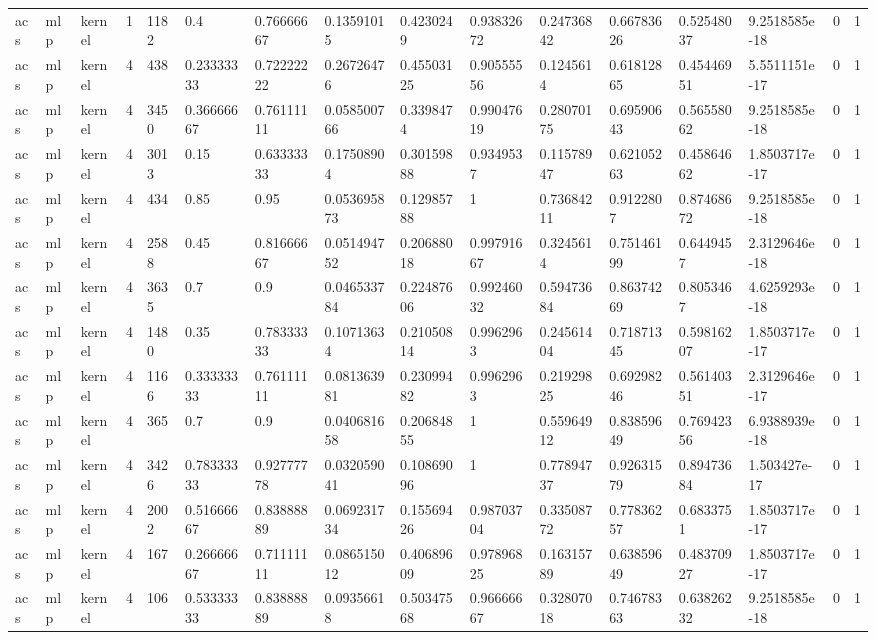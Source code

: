 \begin{tabular}{llllllllllllllll}
acs & mlp & kernel & 1 & 1182 & 0.4 & 0.76666667 & 0.13591015 & 0.4230249 & 0.93832672 & 0.24736842 & 0.66783626 & 0.52548037 & 9.2518585e-18 & 0 & 1 \\
acs & mlp & kernel & 4 & 438 & 0.23333333 & 0.72222222 & 0.26726476 & 0.45503125 & 0.90555556 & 0.1245614 & 0.61812865 & 0.45446951 & 5.5511151e-17 & 0 & 1 \\
acs & mlp & kernel & 4 & 3450 & 0.36666667 & 0.76111111 & 0.058500766 & 0.3398474 & 0.99047619 & 0.28070175 & 0.69590643 & 0.56558062 & 9.2518585e-18 & 0 & 1 \\
acs & mlp & kernel & 4 & 3013 & 0.15 & 0.63333333 & 0.17508904 & 0.30159888 & 0.9349537 & 0.11578947 & 0.62105263 & 0.45864662 & 1.8503717e-17 & 0 & 1 \\
acs & mlp & kernel & 4 & 434 & 0.85 & 0.95 & 0.053695873 & 0.12985788 & 1 & 0.73684211 & 0.9122807 & 0.87468672 & 9.2518585e-18 & 0 & 1 \\
acs & mlp & kernel & 4 & 2588 & 0.45 & 0.81666667 & 0.051494752 & 0.20688018 & 0.99791667 & 0.3245614 & 0.75146199 & 0.6449457 & 2.3129646e-18 & 0 & 1 \\
acs & mlp & kernel & 4 & 3635 & 0.7 & 0.9 & 0.046533784 & 0.22487606 & 0.99246032 & 0.59473684 & 0.86374269 & 0.8053467 & 4.6259293e-18 & 0 & 1 \\
acs & mlp & kernel & 4 & 1480 & 0.35 & 0.78333333 & 0.10713634 & 0.21050814 & 0.9962963 & 0.24561404 & 0.71871345 & 0.59816207 & 1.8503717e-17 & 0 & 1 \\
acs & mlp & kernel & 4 & 1166 & 0.33333333 & 0.76111111 & 0.081363981 & 0.23099482 & 0.9962963 & 0.21929825 & 0.69298246 & 0.56140351 & 2.3129646e-17 & 0 & 1 \\
acs & mlp & kernel & 4 & 365 & 0.7 & 0.9 & 0.040681658 & 0.20684855 & 1 & 0.55964912 & 0.83859649 & 0.76942356 & 6.9388939e-18 & 0 & 1 \\
acs & mlp & kernel & 4 & 3426 & 0.78333333 & 0.92777778 & 0.032059041 & 0.10869096 & 1 & 0.77894737 & 0.92631579 & 0.89473684 & 1.503427e-17 & 0 & 1 \\
acs & mlp & kernel & 4 & 2002 & 0.51666667 & 0.83888889 & 0.069231734 & 0.15569426 & 0.98703704 & 0.33508772 & 0.77836257 & 0.6833751 & 1.8503717e-17 & 0 & 1 \\
acs & mlp & kernel & 4 & 167 & 0.26666667 & 0.71111111 & 0.086515012 & 0.40689609 & 0.97896825 & 0.16315789 & 0.63859649 & 0.48370927 & 1.8503717e-17 & 0 & 1 \\
acs & mlp & kernel & 4 & 106 & 0.53333333 & 0.83888889 & 0.09356618 & 0.50347568 & 0.96666667 & 0.32807018 & 0.74678363 & 0.63826232 & 9.2518585e-18 & 0 & 1 \\

\end{tabular}

